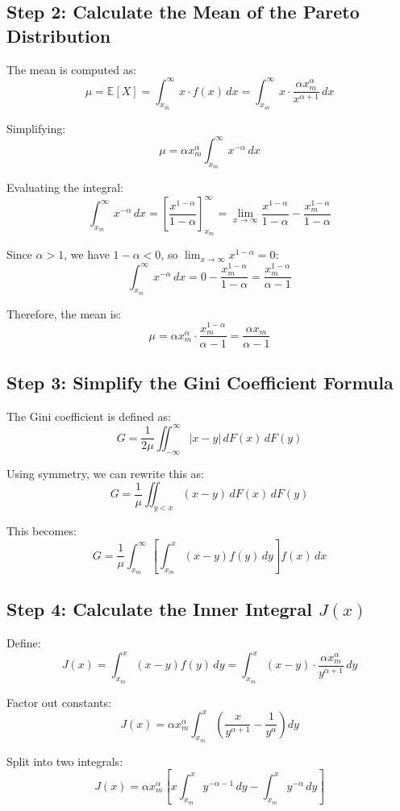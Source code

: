 \documentclass[12pt,a4paper]{article}
\theoremstyle{definition}
\begin{document}
\subsection{Step 2: Calculate the Mean of the Pareto Distribution}

The mean is computed as:
\[
\mu = \mathbb{E}[X] = \int_{x_m}^\infty x \cdot f(x) \, dx = \int_{x_m}^\infty x \cdot \frac{\alpha x_m^\alpha}{x^{\alpha+1}} \, dx
\]

Simplifying:
\[
\mu = \alpha x_m^\alpha \int_{x_m}^\infty x^{-\alpha} \, dx
\]

Evaluating the integral:
\[
\int_{x_m}^\infty x^{-\alpha} \, dx = \left[ \frac{x^{1-\alpha}}{1-\alpha} \right]_{x_m}^\infty = \lim_{x \to \infty} \frac{x^{1-\alpha}}{1-\alpha} - \frac{x_m^{1-\alpha}}{1-\alpha}
\]

Since $\alpha > 1$, we have $1-\alpha < 0$, so $\lim_{x \to \infty} x^{1-\alpha} = 0$:
\[
\int_{x_m}^\infty x^{-\alpha} \, dx = 0 - \frac{x_m^{1-\alpha}}{1-\alpha} = \frac{x_m^{1-\alpha}}{\alpha - 1}
\]

Therefore, the mean is:
\[
\mu = \alpha x_m^\alpha \cdot \frac{x_m^{1-\alpha}}{\alpha - 1} = \frac{\alpha x_m}{\alpha - 1}
\]

\subsection{Step 3: Simplify the Gini Coefficient Formula}

The Gini coefficient is defined as:
\[
G = \frac{1}{2\mu} \iint_{-\infty}^{\infty} |x - y| \, dF(x) \, dF(y)
\]

Using symmetry, we can rewrite this as:
\[
G = \frac{1}{\mu} \iint_{y < x} (x - y) \, dF(x) \, dF(y)
\]

This becomes:
\[
G = \frac{1}{\mu} \int_{x_m}^\infty \left[ \int_{x_m}^x (x - y) f(y) \, dy \right] f(x) \, dx
\]

\subsection{Step 4: Calculate the Inner Integral $J(x)$}

Define:
\[
J(x) = \int_{x_m}^x (x - y) f(y) \, dy = \int_{x_m}^x (x - y) \cdot \frac{\alpha x_m^\alpha}{y^{\alpha+1}} \, dy
\]

Factor out constants:
\[
J(x) = \alpha x_m^\alpha \int_{x_m}^x \left( \frac{x}{y^{\alpha+1}} - \frac{1}{y^\alpha} \right) dy
\]

Split into two integrals:
\[
J(x) = \alpha x_m^\alpha \left[ x \int_{x_m}^x y^{-\alpha-1} \, dy - \int_{x_m}^x y^{-\alpha} \, dy \right]
\]
\end{document}
